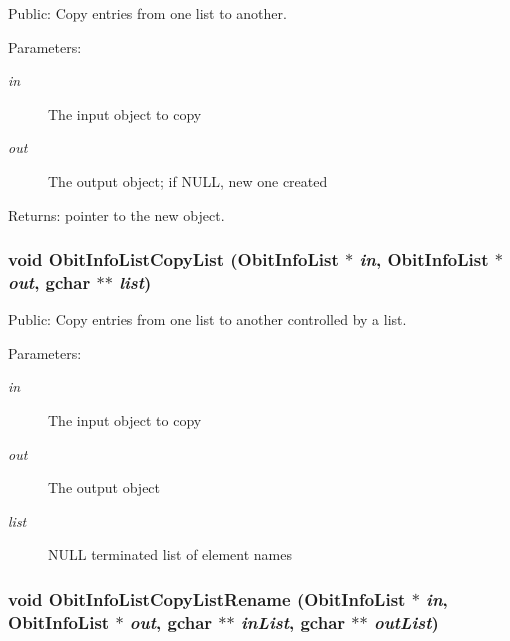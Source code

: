 Public: Copy entries from one list to another. 

\begin{Desc}
\item[Parameters:]
\begin{description}
\item[{\em in}]The input object to copy \item[{\em out}]The output object; if NULL, new one created \end{description}
\end{Desc}
\begin{Desc}
\item[Returns:]pointer to the new object. \end{Desc}
\subsubsection{\setlength{\rightskip}{0pt plus 5cm}void Obit\-Info\-List\-Copy\-List ({\bf Obit\-Info\-List} $\ast$ {\em in}, {\bf Obit\-Info\-List} $\ast$ {\em out}, gchar $\ast$$\ast$ {\em list})}\label{ObitInfoList_8c_a8}


Public: Copy entries from one list to another controlled by a list. 

\begin{Desc}
\item[Parameters:]
\begin{description}
\item[{\em in}]The input object to copy \item[{\em out}]The output object \item[{\em list}]NULL terminated list of element names \end{description}
\end{Desc}
\subsubsection{\setlength{\rightskip}{0pt plus 5cm}void Obit\-Info\-List\-Copy\-List\-Rename ({\bf Obit\-Info\-List} $\ast$ {\em in}, {\bf Obit\-Info\-List} $\ast$ {\em out}, gchar $\ast$$\ast$ {\em in\-List}, gchar $\ast$$\ast$ {\em out\-List})}\label{ObitInfoList_8c_a9}


